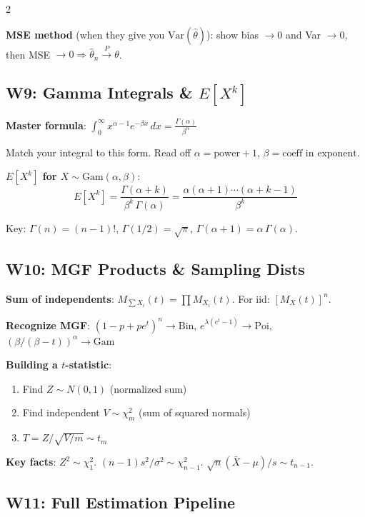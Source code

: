\documentclass[8pt]{extarticle}
\begin{document}
\begin{multicols}{2}
\medskip

\textbf{MSE method} (when they give you $\text{Var}(\hat\theta)$): show bias $\to 0$ and Var $\to 0$, then MSE $\to 0 \Rightarrow \hat\theta_n\xrightarrow{P}\theta$.

\subsection{W9: Gamma Integrals \& $E[X^k]$}

\textbf{Master formula}: $\displaystyle\int_0^\infty x^{\alpha-1}e^{-\beta x}\,dx = \frac{\Gamma(\alpha)}{\beta^\alpha}$

Match your integral to this form. Read off $\alpha = \text{power}+1$, $\beta = \text{coeff in exponent}$.

\textbf{$E[X^k]$ for $X\sim\text{Gam}(\alpha,\beta)$}:
$$E[X^k] = \frac{\Gamma(\alpha+k)}{\beta^k\,\Gamma(\alpha)} = \frac{\alpha(\alpha{+}1)\cdots(\alpha{+}k{-}1)}{\beta^k}$$

Key: $\Gamma(n)=(n{-}1)!$, \; $\Gamma(1/2)=\sqrt\pi$, \; $\Gamma(\alpha{+}1)=\alpha\,\Gamma(\alpha)$.

\subsection{W10: MGF Products \& Sampling Dists}

\textbf{Sum of independents}: $M_{\sum X_i}(t) = \prod M_{X_i}(t)$. For iid: $[M_X(t)]^n$.

\textbf{Recognize MGF}:
$(1{-}p{+}pe^t)^n \to \text{Bin}$, \;
$e^{\lambda(e^t-1)} \to \text{Poi}$, \;
$(\beta/(\beta{-}t))^\alpha \to \text{Gam}$

\textbf{Building a $t$-statistic}:
\begin{enumerate}
\item Find $Z\sim N(0,1)$ (normalized sum)
\item Find independent $V\sim\chi^2_m$ (sum of squared normals)
\item $T = Z/\sqrt{V/m} \sim t_m$
\end{enumerate}

\textbf{Key facts}: $Z^2\sim\chi^2_1$. \; $(n{-}1)s^2/\sigma^2\sim\chi^2_{n-1}$. \; $\sqrt{n}(\bar X{-}\mu)/s \sim t_{n-1}$.

\subsection{W11: Full Estimation Pipeline}


\end{multicols}
\end{document}

